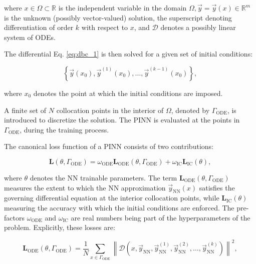 where $x \in \Omega \subset \mathbb{R}$ is the independent variable in the domain $\Omega, \vec{y} = \vec{y}(x) \in \mathbb{R}^m$ is the unknown (possibly vector-valued) solution, the superscript denoting differentiation of order $k$ with respect to $x$, and $\mathcal{D}$ denotes a possibly linear system of ODEs.

The differential Eq. \ref{eq:dbc_1} is then solved for a given set of initial conditions:

\begin{equation}\label{eq:dbc_2}
\left\{\vec{y}(x_0),\vec{y}^{(1)}(x_0),\ldots,\vec{y}^{(k-1)}(x_0)\right\},
\end{equation}

where $x_0$ denotes the point at which the initial conditions are imposed.

A finite set of $N$ collocation points in the interior of $\Omega$, denoted by $\Gamma_{\mathrm{ODE}}$, is introduced to discretize the solution. The PINN is evaluated at the points in $\Gamma_{\mathrm{ODE}}$, during the training process.

The canonical loss function of a PINN consists of two contributions:

\begin{equation}\label{eq:dbc_3}
\mathbf{L}(\theta,\Gamma_{\mathrm{ODE}})=\omega_{\mathrm{ODE}}\mathbf{L}_{\mathrm{ODE}}(\theta,\Gamma_{\mathrm{ODE}})+\omega_{\mathrm{IC}}\mathbf{L}_{\mathrm{IC}}(\theta),
\end{equation}

where $\theta$ denotes the NN trainable parameters. The term $\mathbf{L}_{\mathrm{ODE}} (\theta, \Gamma_{\mathrm{ODE}} )$ measures the extent to which the NN approximation $\vec{y}_{\mathrm{NN}} (x)$ satisfies the governing differential equation at the interior collocation points, while $\mathbf{L}_{\mathrm{IC}} (\theta)$ measuring the accuracy with which the initial conditions are enforced. The pre-factors $\omega_{\mathrm{ODE}}$ and $\omega_{\mathrm{IC}}$ are real numbers being part of the hyperparameters of the problem. Explicitly, these losses are:

\begin{equation}\label{eq:dbc_4}
\mathbf{L}_{\mathrm{ODE}}(\theta,\Gamma_{\mathrm{ODE}})=\frac{1}{N}\sum_{x\in\Gamma_{\mathrm{ODE}}}\left\|\mathcal{D}\left(x,\vec{y}_{\mathrm{NN}},\vec{y}_{\mathrm{NN}}^{(1)},\vec{y}_{\mathrm{NN}}^{(2)},\ldots,\vec{y}_{\mathrm{NN}}^{(k)}\right)\right\|^2,
\end{equation}

